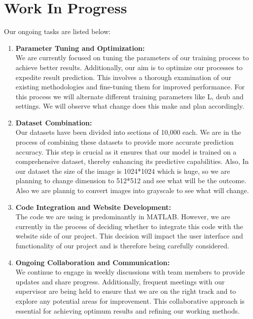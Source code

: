 \chapter{Work In Progress}
Our ongoing tasks are listed below:
\begin{enumerate}[label=\arabic*.]
    \item \textbf{Parameter Tuning and Optimization:} \\
    We are currently focused on tuning the parameters of our training process to achieve better results. Additionally, our aim is to optimize our processes to expedite result prediction. This involves a thorough examination of our existing methodologies and fine-tuning them for improved performance. For this process we will alternate different training parameters like L, dsub and settings. We will observe what change does this make and plan accordingly.
    
    \item \textbf{Dataset Combination:} \\
    Our datasets have been divided into sections of 10,000 each. We are in the process of combining these datasets to provide more accurate prediction accuracy. This step is crucial as it ensures that our model is trained on a comprehensive dataset, thereby enhancing its predictive capabilities. Also, In our dataset the size of the image is 1024*1024 which is huge, so we are planning to change dimension to 512*512 and see what will be the outcome. Also we are plannig to convert images into grayscale to see what will change.
    
    \item \textbf{Code Integration and Website Development:} \\
    The code we are using is predominantly in MATLAB. However, we are currently in the process of deciding whether to integrate this code with the website side of our project. This decision will impact the user interface and functionality of our project and is therefore being carefully considered.
    
    \item \textbf{Ongoing Collaboration and Communication:} \\
    We continue to engage in weekly discussions with team members to provide updates and share progress. Additionally, frequent meetings with our supervisor are being held to ensure that we are on the right track and to explore any potential areas for improvement. This collaborative approach is essential for achieving optimum results and refining our working methods.
\end{enumerate}